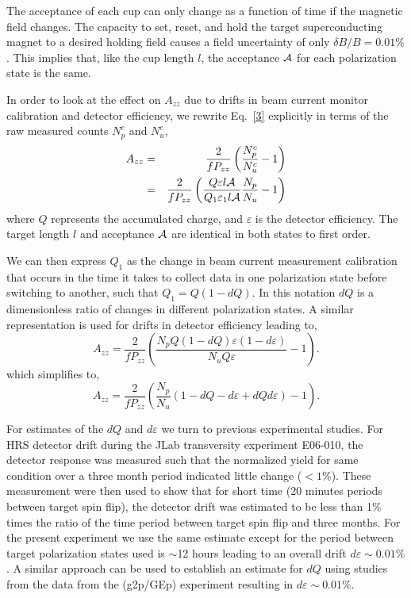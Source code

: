 The acceptance of each cup can only change as a function of time if the magnetic field changes.  
The capacity to set, reset, and hold the target superconducting magnet to a desired holding field causes a field uncertainty of only $\delta B /B=0.01\%$. 
This implies that, like the cup length $l$, the acceptance ${\cal A}$ for each polarization state is the same.

In order to look at the effect on $A_{zz}$ due to drifts in beam current monitor calibration and detector efficiency, we rewrite Eq.~\ref{3} explicitly in terms of the raw measured counts $N_p^c$ and $N_u^c$,
\begin{eqnarray} \label{3c}
\nonumber
A_{zz}&=&\frac{2}{fP_{zz}}\left(\frac{N^c_p}{N^c_u}-1\right) \\
      &=&\frac{2}{fP_{zz}}\left(\frac{Q\varepsilon l \cal{A}}{Q_1\varepsilon_1 l \cal{A}}\frac{N_p}{N_u}-1\right)
\end{eqnarray}
where $Q$ represents the accumulated charge, and $\varepsilon$ is the detector efficiency. The target length $l$  and acceptance $\cal{A}$ are identical in both states to first order.

We can then express $Q_1$ as the change in beam current measurement calibration that occurs in
the time it takes to collect data in one polarization state before switching to another, such that $Q_1=Q(1-dQ)$.
In this notation $dQ$ is a dimensionless ratio of changes in different polarization states.  A similar representation
is used for drifts in detector efficiency leading to,
\begin{equation}
A_{zz}=\frac{2}{fP_{zz}}\left(\frac{N_pQ(1-dQ)\varepsilon(1-d\varepsilon)}{N_u Q\varepsilon}-1\right).
\end{equation}
which simplifies to,
\begin{equation}
A_{zz}=\frac{2}{fP_{zz}}\left(\frac{N_p}{N_u}(1-dQ-d\varepsilon+dQd\varepsilon)-1\right).
\end{equation}

For estimates of the $dQ$ and $d\varepsilon$ we turn to previous experimental
studies.  For HRS detector drift during the JLab transversity experiment E06-010, the detector response was measured such that the normalized yield for same condition over a three month period indicated little change ($<1$\%).
These measurement were then used to show that for short time (20 minutes periods between target spin flip),
the detector drift was estimated to be less than 1\% times the ratio of the time period between target spin flip and three months.
For the present experiment we use the same estimate except for the period between target polarization states used is
$\sim$12 hours leading to an overall drift $d\varepsilon\sim0.01\%$.  A similar approach can be used to establish an estimate
for $dQ$ using studies from the data from the (g2p/GEp) experiment resulting in $d\varepsilon\sim0.01\%$.

